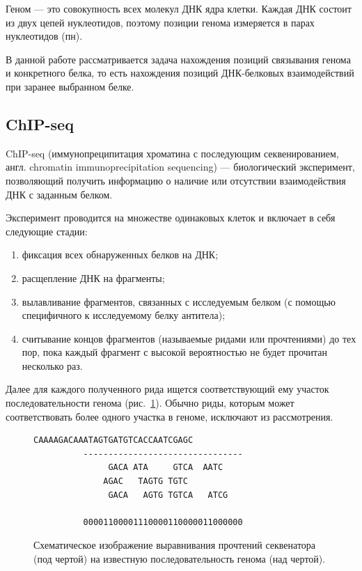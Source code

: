 \documentclass{matmex-diploma-custom}
\begin{document}
Геном --- это совокупность всех молекул ДНК ядра клетки.
Каждая ДНК состоит из двух цепей нуклеотидов, поэтому позиции генома измеряется в парах нуклеотидов (пн).

В данной работе рассматривается задача нахождения позиций связывания генома и конкретного белка, то есть нахождения позиций ДНК-белковых взаимодействий при заранее выбранном белке. 

\subsection*{ChIP-seq}
ChIP-seq (иммунопреципитация хроматина с последующим секвенированием, англ. chromatin immunoprecipitation sequencing) --- биологический эксперимент, позволяющий получить информацию о наличие или отсутствии
взаимодействия ДНК с заданным белком.

Эксперимент проводится на множестве одинаковых клеток и включает в себя следующие стадии:
\begin{enumerate}
\item фиксация всех обнаруженных белков на ДНК;
\item расщепление ДНК на фрагменты;
\item вылавливание фрагментов, связанных с исследуемым белком (с помощью специфичного к исследуемому белку антитела);
\item считывание концов фрагментов (называемые ридами или прочтениями) до тех пор, пока каждый фрагмент с высокой вероятностью не будет прочитан несколько раз.
\end{enumerate} 

Далее для каждого полученного рида ищется соответствующий
ему участок последовательности генома (рис.~\ref{fig:chip-seq}). Обычно
риды, которым может соответствовать более одного участка в геноме,
исключают из рассмотрения.

\begin{figure}[h]
  \centering

\begin{Verbatim}[commandchars=\\\{\}]
          CAAAAGACAAATAGTGATGTCACCAATCGAGC
          --------------------------------
               GACA ATA     GTCA  AATC
              AGAC   TAGTG TGTC
               GACA   AGTG TGTCA   ATCG

          00001100001110000110000011000000
\end{Verbatim}
  \caption{Схематическое изображение выравнивания прочтений секвенатора (под чертой)
    на известную последовательность генома (над чертой).}
  \label{fig:chip-seq}
\end{figure}
\end{document}
